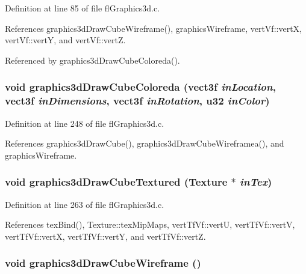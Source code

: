 Definition at line 85 of file fl\-Graphics3d.c.

References graphics3d\-Draw\-Cube\-Wireframe(), graphics\-Wireframe, vert\-Vf::vert\-X, vert\-Vf::vert\-Y, and vert\-Vf::vert\-Z.

Referenced by graphics3d\-Draw\-Cube\-Coloreda().
\subsubsection{\setlength{\rightskip}{0pt plus 5cm}void graphics3d\-Draw\-Cube\-Coloreda ({\bf vect3f} {\em in\-Location}, {\bf vect3f} {\em in\-Dimensions}, {\bf vect3f} {\em in\-Rotation}, u32 {\em in\-Color})}\label{flGraphics3d_8c_ac0446517eb2c96b5021cd2ad8a013d8}




Definition at line 248 of file fl\-Graphics3d.c.

References graphics3d\-Draw\-Cube(), graphics3d\-Draw\-Cube\-Wireframea(), and graphics\-Wireframe.
\subsubsection{\setlength{\rightskip}{0pt plus 5cm}void graphics3d\-Draw\-Cube\-Textured ({\bf Texture} $\ast$ {\em in\-Tex})}\label{flGraphics3d_8c_17894417032253bd513612931b2653bc}




Definition at line 263 of file fl\-Graphics3d.c.

References tex\-Bind(), Texture::tex\-Mip\-Maps, vert\-Tf\-Vf::vert\-U, vert\-Tf\-Vf::vert\-V, vert\-Tf\-Vf::vert\-X, vert\-Tf\-Vf::vert\-Y, and vert\-Tf\-Vf::vert\-Z.
\subsubsection{\setlength{\rightskip}{0pt plus 5cm}void graphics3d\-Draw\-Cube\-Wireframe ()}\label{flGraphics3d_8c_bb58801464c96ef8a95409f1ad292eb3}




